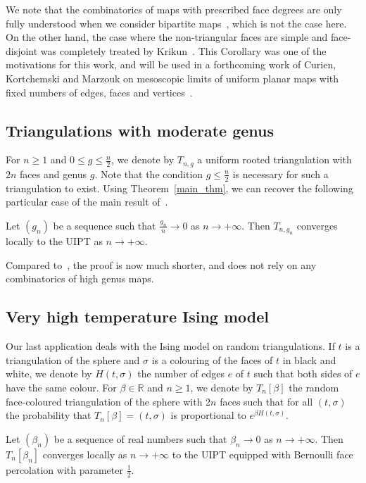\documentclass[10pt]{amsart}
\theoremstyle{definition}\newtheorem{defi}[theo]{Definition}\newtheorem{rema}[theo]{Remark}\newtheorem{exam}[theo]{Example}\newtheorem{exem}[theo]{Example}\newtheorem{nota}[theo]{Notation}
\newcommand{\R}{\mathbb{R}}
\begin{document}
We note that the combinatorics of maps with prescribed face degrees are only fully understood when we consider bipartite maps~\cite{MM07}, which is not the case here. On the other hand, the case where the non-triangular faces are simple and face-disjoint was completely treated by Krikun~\cite{Kri07}. This Corollary was one of the motivations for this work, and will be used in a forthcoming work of Curien, Kortchemski and Marzouk on mesoscopic limits of uniform planar maps with fixed numbers of edges, faces and vertices~\cite{CKM21}.

\subsection*{Triangulations with moderate genus} For $n \geq 1$ and $0 \leq g \leq \frac{n}{2}$, we denote by $T_{n,g}$ a uniform rooted triangulation with $2n$ faces and genus $g$. Note that the condition $g \leq \frac{n}{2}$ is necessary for such a triangulation to exist. Using Theorem~\ref{main_thm}, we can recover the following particular case of the main result of~\cite{BL19}.

\begin{coro}\label{cor_moderate_genus}
Let $(g_n)$ be a sequence such that $\frac{g_n}{n} \to 0$ as $n \to +\infty$. Then $T_{n,g_n}$ converges locally to the UIPT as $n \to +\infty$.
\end{coro}

Compared to~\cite{BL19}, the proof is now much shorter, and does not rely on any combinatorics of high genus maps.

\subsection*{Very high temperature Ising model} Our last application deals with the Ising model on random triangulations. If $t$ is a triangulation of the sphere and $\sigma$ is a colouring of the faces of $t$ in black and white, we denote by $H(t,\sigma)$ the number of edges $e$ of $t$ such that both sides of $e$ have the same colour. For $\beta \in \R$ and $n \geq 1$, we denote by $T_n[\beta]$ the random face-coloured triangulation of the sphere with $2n$ faces such that for all $(t, \sigma)$ the probability that $T_n[\beta]=(t,\sigma)$ is proportional to $e^{\beta H(t,\sigma)}$.

\begin{coro}\label{cor_Ising}
Let $(\beta_n)$ be a sequence of real numbers such that $\beta_n \to 0$ as $n \to +\infty$. Then $T_n[\beta_n]$ converges locally as $n \to +\infty$ to the UIPT equipped with Bernoulli face percolation with parameter $\frac{1}{2}$.
\end{coro}
\end{document}
